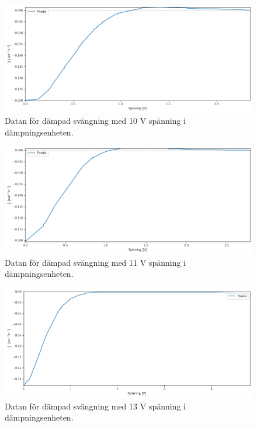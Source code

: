 \documentclass[12pt, a4paper]{article}
\begin{document}
\begin{figure}[hp]
    \includegraphics[width=\textwidth]{graf_10_v_centered}
    \caption{Datan för dämpad svängning med 10 V spänning i dämpningsenheten.}
    \label{fig:data_10_v}
\end{figure}

\begin{figure}[hp]
    \includegraphics[width=\textwidth]{graf_11_v_centered}
    \caption{Datan för dämpad svängning med 11 V spänning i dämpningsenheten.}
    \label{fig:data_11_v}
\end{figure}

\begin{figure}[hp]
    \includegraphics[width=\textwidth]{graf_13_v_centered}
    \caption{Datan för dämpad svängning med 13 V spänning i dämpningsenheten.}
    \label{fig:data_13_v}
\end{figure}
\end{document}
